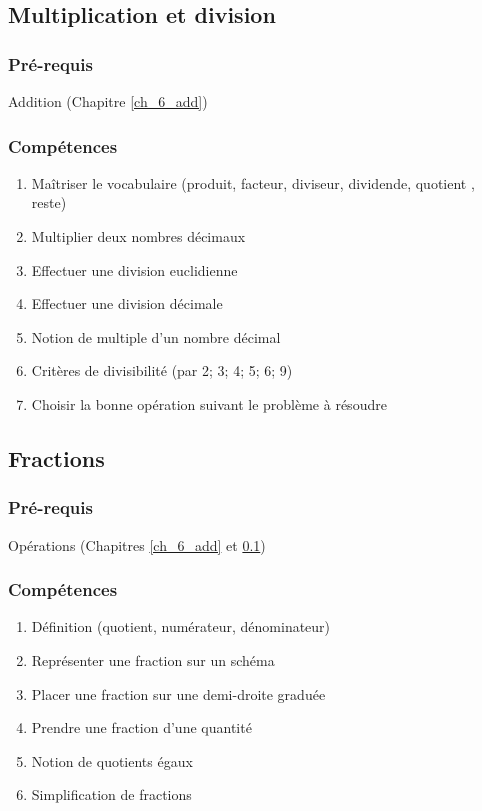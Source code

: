 \subsection{Multiplication et division}\label{ch_6_multi}

\subsubsection*{Pré-requis}

Addition (Chapitre \ref{ch_6_add})

\subsubsection*{Compétences}
\begin{enumerate}
	\item Maîtriser le vocabulaire  (produit, facteur, diviseur, dividende, quotient , reste)
	\item Multiplier deux nombres décimaux
	\item Effectuer une division euclidienne
	\item Effectuer une division décimale
	\item Notion de multiple d'un nombre décimal
	\item Critères de divisibilité (par 2; 3; 4; 5; 6; 9)
	\item Choisir la bonne opération suivant le problème à résoudre
\end{enumerate}


\subsection{Fractions}\label{ch_6_frac}

\subsubsection{Pré-requis}
Opérations (Chapitres \ref{ch_6_add} et \ref{ch_6_multi})

\subsubsection*{Compétences}
\begin{enumerate}
	\item Définition (quotient, numérateur, dénominateur)
	\item Représenter une fraction sur un schéma
	\item Placer une fraction sur une demi-droite graduée
	\item Prendre une fraction d'une quantité
	\item Notion de quotients égaux
	\item Simplification de fractions
\end{enumerate}

